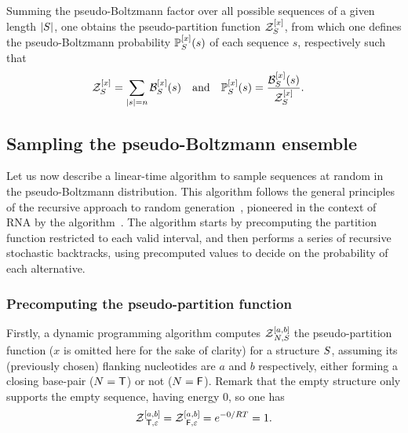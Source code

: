 Summing the pseudo-Boltzmann factor over all possible sequences of a given length $|\Struct|$, one obtains the pseudo-partition function $\mathcal{Z}_{\Struct}^{[x]}$, from which one defines the pseudo-Boltzmann probability $\Prob_{\Struct}^{[x]}(s)$ of each sequence $s$, respectively such that 
\begin{align}\mathcal{Z}_{\Struct}^{[x]} &= \sum_{\substack{|s|=n}}\B_{\Struct}^{[x]}(s)& \text{and}&&
\Prob_{\Struct}^{[x]}(s) &= \frac{\B_{\Struct}^{[x]}(s)}{\mathcal{Z}_{\Struct}^{[x]}}.\label{def:distribution}\end{align}

\subsection{Sampling the pseudo-Boltzmann ensemble}

Let us now describe a linear-time algorithm to sample sequences at random in the pseudo-Boltzmann distribution. This algorithm follows the general principles of the recursive approach to random generation~\cite{Wilf1977}, pioneered in the context of RNA by the \SFold algorithm~\cite{Ding2003}. The algorithm starts by precomputing the partition function restricted to each valid interval, and then performs a series of recursive stochastic backtracks, using precomputed values to decide on the probability of each alternative. 

\subsubsection{Precomputing the pseudo-partition function}\label{sec:pf}



Firstly, a dynamic programming algorithm computes $\Z{\N,\Struct}{a,b}$ the pseudo-partition function ($x$ is omitted here for the sake of clarity) for a structure $\Struct$, assuming its (previously chosen) flanking nucleotides are $a$ and $b$ respectively, either forming a closing base-pair ($\N=\BoolTrue$) or not ($\N=\BoolFalse$). 
Remark that the empty structure only supports the empty sequence, having energy $0$, so one has
\begin{equation}
	\Z{\BoolTrue,\varepsilon}{a,b}=\Z{\BoolFalse,\varepsilon}{a,b}= e^{-0/RT} = 1.
	\label{eq:Z_in}
\end{equation}


